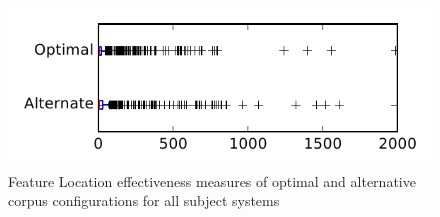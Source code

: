 
\begin{figure}
\centering
\includegraphics[height=0.4\textheight]{figures/combo/flt_rq2_tiny}
\caption{Feature Location effectiveness measures of optimal and alternative corpus configurations for all subject systems}
\label{fig:combo:flt:rq2:tiny}
\end{figure}
